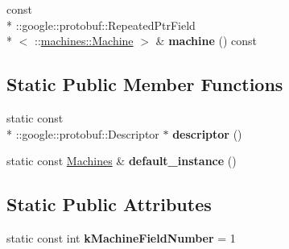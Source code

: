 \begin{DoxyCompactItemize}
\item 
\hypertarget{classmachines_1_1Machines_ad023d0f06d19351ecd167f54317c517c}{const \\*
\-::google\-::protobuf\-::\-Repeated\-Ptr\-Field\\*
$<$ \-::\hyperlink{classmachines_1_1Machine}{machines\-::\-Machine} $>$ \& {\bfseries machine} () const }\label{classmachines_1_1Machines_ad023d0f06d19351ecd167f54317c517c}

\end{DoxyCompactItemize}
\subsection*{Static Public Member Functions}
\begin{DoxyCompactItemize}
\item 
\hypertarget{classmachines_1_1Machines_a52bf81fa69df98a1678a0fa4348aa881}{static const \\*
\-::google\-::protobuf\-::\-Descriptor $\ast$ {\bfseries descriptor} ()}\label{classmachines_1_1Machines_a52bf81fa69df98a1678a0fa4348aa881}

\item 
\hypertarget{classmachines_1_1Machines_a8dd32d0d5d1c9eb75693426e1451a197}{static const \hyperlink{classmachines_1_1Machines}{Machines} \& {\bfseries default\-\_\-instance} ()}\label{classmachines_1_1Machines_a8dd32d0d5d1c9eb75693426e1451a197}

\end{DoxyCompactItemize}
\subsection*{Static Public Attributes}
\begin{DoxyCompactItemize}
\item 
\hypertarget{classmachines_1_1Machines_a005ddddbd827ea28365be296f13ca5e2}{static const int {\bfseries k\-Machine\-Field\-Number} = 1}\label{classmachines_1_1Machines_a005ddddbd827ea28365be296f13ca5e2}

\end{DoxyCompactItemize}
